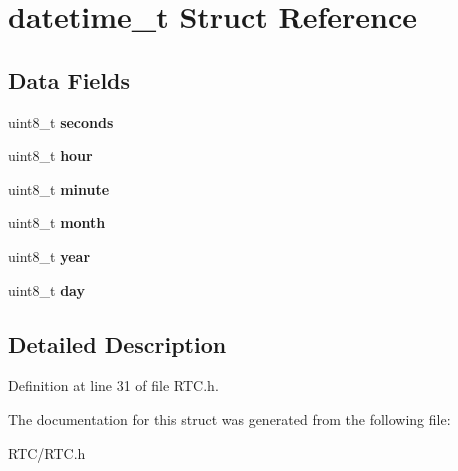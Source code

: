 \hypertarget{structdatetime__t}{}\section{datetime\+\_\+t Struct Reference}
\label{structdatetime__t}
\subsection*{Data Fields}
\begin{DoxyCompactItemize}
\item 
\hypertarget{structdatetime__t_a46729a903be1a03cdb248fb48d84d4f5}{}uint8\+\_\+t {\bfseries seconds}\label{structdatetime__t_a46729a903be1a03cdb248fb48d84d4f5}

\item 
\hypertarget{structdatetime__t_ae5af4ff48939d13d480f87e56a9385d6}{}uint8\+\_\+t {\bfseries hour}\label{structdatetime__t_ae5af4ff48939d13d480f87e56a9385d6}

\item 
\hypertarget{structdatetime__t_a8ff981ec55c945940f4a0da7d8709b3c}{}uint8\+\_\+t {\bfseries minute}\label{structdatetime__t_a8ff981ec55c945940f4a0da7d8709b3c}

\item 
\hypertarget{structdatetime__t_a3e00faf7fbf9805e9ec4d2edd6339050}{}uint8\+\_\+t {\bfseries month}\label{structdatetime__t_a3e00faf7fbf9805e9ec4d2edd6339050}

\item 
\hypertarget{structdatetime__t_a7af2065789bc84419b8d5fe109be83b5}{}uint8\+\_\+t {\bfseries year}\label{structdatetime__t_a7af2065789bc84419b8d5fe109be83b5}

\item 
\hypertarget{structdatetime__t_a72369a1087b2aeffe374bb054cb97c12}{}uint8\+\_\+t {\bfseries day}\label{structdatetime__t_a72369a1087b2aeffe374bb054cb97c12}

\end{DoxyCompactItemize}


\subsection{Detailed Description}


Definition at line 31 of file R\+T\+C.\+h.



The documentation for this struct was generated from the following file\+:\begin{DoxyCompactItemize}
\item 
R\+T\+C/R\+T\+C.\+h\end{DoxyCompactItemize}
